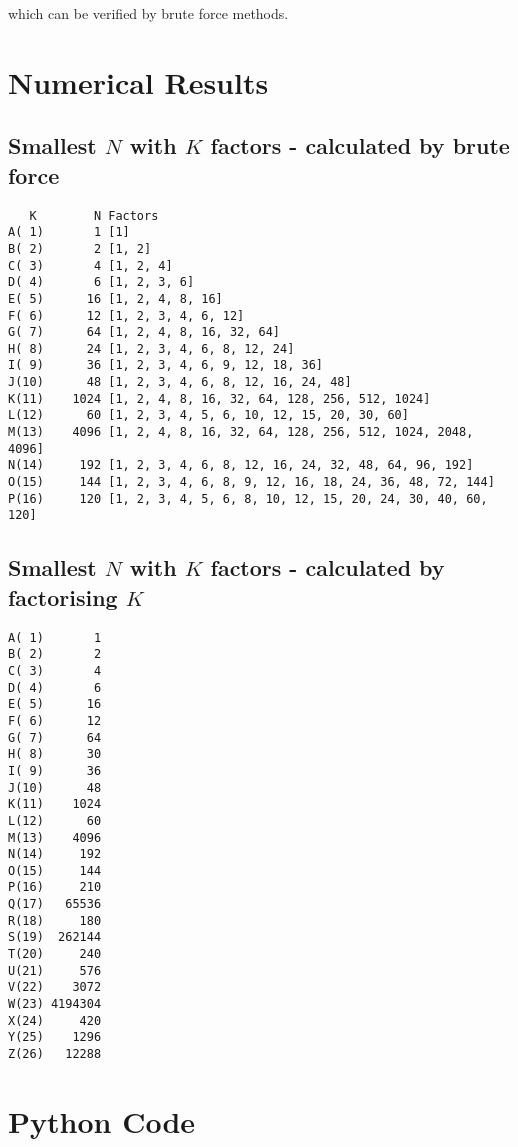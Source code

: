 \documentclass{article}
\begin{document}
which can be verified by brute force methods.

\pagebreak
\section*{Numerical Results}
\subsection*{Smallest $N$ with $K$ factors - calculated by brute force}
\begin{verbatim}
   K        N Factors
A( 1)       1 [1]
B( 2)       2 [1, 2]
C( 3)       4 [1, 2, 4]
D( 4)       6 [1, 2, 3, 6]
E( 5)      16 [1, 2, 4, 8, 16]
F( 6)      12 [1, 2, 3, 4, 6, 12]
G( 7)      64 [1, 2, 4, 8, 16, 32, 64]
H( 8)      24 [1, 2, 3, 4, 6, 8, 12, 24]
I( 9)      36 [1, 2, 3, 4, 6, 9, 12, 18, 36]
J(10)      48 [1, 2, 3, 4, 6, 8, 12, 16, 24, 48]
K(11)    1024 [1, 2, 4, 8, 16, 32, 64, 128, 256, 512, 1024]
L(12)      60 [1, 2, 3, 4, 5, 6, 10, 12, 15, 20, 30, 60]
M(13)    4096 [1, 2, 4, 8, 16, 32, 64, 128, 256, 512, 1024, 2048, 4096]
N(14)     192 [1, 2, 3, 4, 6, 8, 12, 16, 24, 32, 48, 64, 96, 192]
O(15)     144 [1, 2, 3, 4, 6, 8, 9, 12, 16, 18, 24, 36, 48, 72, 144]
P(16)     120 [1, 2, 3, 4, 5, 6, 8, 10, 12, 15, 20, 24, 30, 40, 60, 120]
\end{verbatim}

\subsection*{Smallest $N$ with $K$ factors - calculated by factorising $K$}

\begin{verbatim}
A( 1)       1
B( 2)       2
C( 3)       4
D( 4)       6
E( 5)      16
F( 6)      12
G( 7)      64
H( 8)      30
I( 9)      36
J(10)      48
K(11)    1024
L(12)      60
M(13)    4096
N(14)     192
O(15)     144
P(16)     210
Q(17)   65536
R(18)     180
S(19)  262144
T(20)     240
U(21)     576
V(22)    3072
W(23) 4194304
X(24)     420
Y(25)    1296
Z(26)   12288

\end{verbatim}

\pagebreak

\section*{Python Code}
\end{document}
